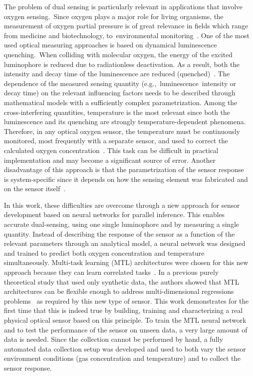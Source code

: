 \documentclass[sensors,article,accept,moreauthors,pdftex,10pt,a4paper]{Definitions/mdpi}
\theoremstyle{definition}
\begin{document}
The problem of dual sensing is particularly relevant in applications that involve oxygen sensing.~Since oxygen plays a major role for living organisms, the measurement of oxygen partial pressure is of great relevance in fields which range from medicine and  biotechnology, to~environmental monitoring~\cite{Papkovsky2013,Wang2014}. One of the most used optical measuring approaches is based on dynamical luminescence quenching.~When colliding with molecular oxygen, the energy of the excited luminophore is reduced due to radiationless deactivation. As a result, both the intensity and decay time of the luminescence are reduced (quenched)~\cite{Lakowicz2006}. The dependence of the measured sensing quantity (e.g.,~luminescence~intensity or decay time) on the relevant influencing factors needs to be described through mathematical models with a sufficiently complex parametrization. Among the cross-interfering quantities, temperature is the most relevant since both the luminescence and its quenching are strongly temperature-dependent phenomena. Therefore, in any optical oxygen sensor, the temperature must be continuously monitored, most frequently with a separate sensor, and used to correct the calculated oxygen concentration~\cite{Li2015}. This task can be difficult in practical implementation and may become a significant source of error. Another disadvantage of this approach is that the parametrization of the sensor response is system-specific since it depends on how the sensing element was fabricated and on the sensor itself~\cite{Xu1994,Draxler1995,Hartmann1996,Mills1998,Badocco2008,Dini2011}.

In this work, these difficulties are overcome through a new approach for sensor development based on neural networks for parallel inference. This enables  accurate dual-sensing, using one single luminophore and by measuring a single quantity.
Instead of describing the response of the sensor as a function of the relevant parameters through an analytical model, a neural network was designed and trained to predict both oxygen concentration and temperature simultaneously.
Multi-task learning (MTL) architectures were chosen for this new approach because they can learn correlated tasks~\cite{Argyriou2006, Thrun1996, Caruana1997, Zhang2017, Baxter2000, Thung2018}. In a previous purely theoretical study that used only synthetic data, the authors showed that MTL architectures can be flexible enough to address multi-dimensional regressions problems~\cite{Michelucci2019_2} as required by this new type of sensor. This work demonstrates for the first time that this is indeed true by building, training and characterizing a real physical optical sensor based on this principle.
To train the MTL neural network and to test the performance of the sensor on unseen data, a very large amount of data is needed. Since the collection  cannot be performed by hand, a fully automated data collection setup was developed and used to both vary the sensor environment conditions (gas concentration and temperature) and to collect the sensor response. 
\end{document}

